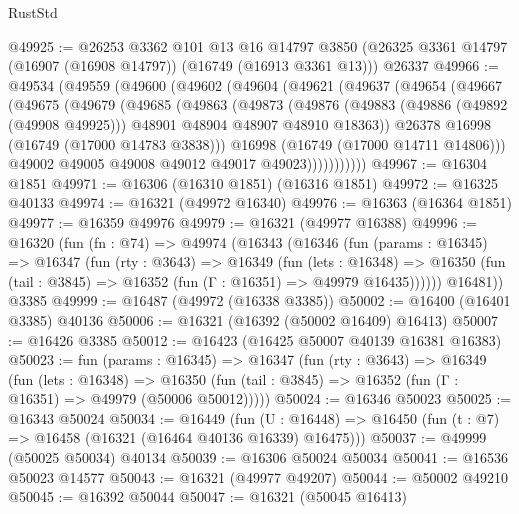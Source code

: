 \begin{lexlean}{RustStd}
\begin{coremodule}
@49925 := @26253
    @3362
    @101
    @13
    @16
    @14797
    @3850
    (@26325 @3361 @14797 (@16907 (@16908 @14797)) (@16749 (@16913 @3361 @13)))
    @26337
@49966 := @49534
    (@49559
      (@49600
        (@49602
          (@49604
            (@49621
              (@49637
                (@49654
                  (@49667
                    (@49675
                      (@49679
                        (@49685
                          (@49863
                            (@49873
                              (@49876
                                (@49883
                                  (@49886 (@49892 (@49908 @49925)))
                                  @48901
                                  @48904
                                  @48907
                                  @48910
                                  @18363))
                              @26378
                              @16998
                              (@16749 (@17000 @14783 @3838)))
                            @16998
                            (@16749 (@17000 @14711 @14806)))
                          @49002
                          @49005
                          @49008
                          @49012
                          @49017
                          @49023)))))))))))
@49967 := @16304 @1851
@49971 := @16306 (@16310 @1851) (@16316 @1851)
@49972 := @16325 @40133
@49974 := @16321 (@49972 @16340)
@49976 := @16363 (@16364 @1851)
@49977 := @16359 @49976
@49979 := @16321 (@49977 @16388)
@49996 := @16320
    (fun (fn : @74) =>
    @49974
      (@16343
        (@16346
          (fun (params : @16345) =>
          @16347
            (fun (rty : @3643) =>
            @16349
              (fun (lets : @16348) =>
              @16350 (fun (tail : @3845) => @16352 (fun (Γ : @16351) => @49979 @16435))))))
        @16481))
    @3385
@49999 := @16487 (@49972 (@16338 @3385))
@50002 := @16400 (@16401 @3385) @40136
@50006 := @16321 (@16392 (@50002 @16409) @16413)
@50007 := @16426 @3385
@50012 := @16423 (@16425 @50007 @40139 @16381 @16383)
@50023 := fun (params : @16345) =>
  @16347
    (fun (rty : @3643) =>
    @16349
      (fun (lets : @16348) =>
      @16350 (fun (tail : @3845) => @16352 (fun (Γ : @16351) => @49979 (@50006 @50012)))))
@50024 := @16346 @50023
@50025 := @16343 @50024
@50034 := @16449
    (fun (U : @16448) => @16450 (fun (t : @7) => @16458 (@16321 (@16464 @40136 @16339) @16475)))
@50037 := @49999 (@50025 @50034) @40134
@50039 := @16306 @50024 @50034
@50041 := @16536 @50023 @14577
@50043 := @16321 (@49977 @49207)
@50044 := @50002 @49210
@50045 := @16392 @50044
@50047 := @16321 (@50045 @16413)

\end{coremodule}
\end{lexlean}
